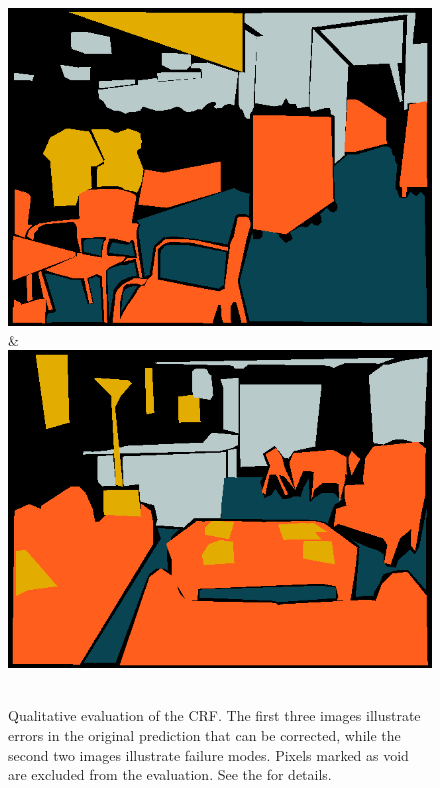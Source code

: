\begin{figure}
\begin{tabu}
    \includegraphics[width=\linewidth]{nyu/images/00118_gt.png}&%
    \includegraphics[width=\linewidth]{nyu/images/01203_gt.png}\\
    \vspace{3mm}\\
    \end{tabu}
\caption{%
Qualitative evaluation of the CRF\@.
The first three images illustrate errors in the original prediction that can be corrected, while
the second two images illustrate failure modes. Pixels marked as void
are excluded from the evaluation. See the  for details.
}
\end{figure}

